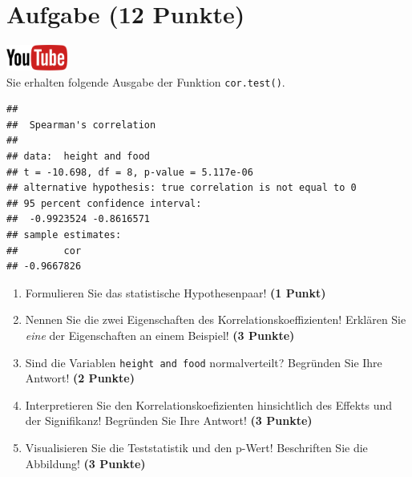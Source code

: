 \documentclass[a4paper, 10pt]{scrartcl}\usepackage[]{graphicx}\usepackage[]{xcolor}
\makeatletter
\newenvironment{kframe}{%
 \def\at@end@of@kframe{}%
 \ifinner\ifhmode%
  \def\at@end@of@kframe{\end{minipage}}%
  \begin{minipage}{\columnwidth}%
 \fi\fi%
 \def\FrameCommand##1{\hskip\@totalleftmargin \hskip-\fboxsep
 \colorbox{shadecolor}{##1}\hskip-\fboxsep
     \hskip-\linewidth \hskip-\@totalleftmargin \hskip\columnwidth}%
 \MakeFramed {\advance\hsize-\width
   \@totalleftmargin\z@ \linewidth\hsize
   \@setminipage}}%
 {\par\unskip\endMakeFramed%
 \at@end@of@kframe}
\newenvironment{knitrout}{}{} %
\makeatother
\begin{document}
 
\clearpage

\section{Aufgabe \hfill (12 Punkte)}

\hfill\href{https://youtu.be/C9skfFRTHhI}{\includegraphics[width =
   2cm]{img/youtube}}\\[1Ex]

Sie erhalten folgende \Rlogo Ausgabe der Funktion \texttt{cor.test()}.

\begin{knitrout}
\color{fgcolor}\begin{kframe}
\begin{verbatim}
## 
## 	Spearman's correlation
## 
## data:  height and food
## t = -10.698, df = 8, p-value = 5.117e-06
## alternative hypothesis: true correlation is not equal to 0
## 95 percent confidence interval:
##  -0.9923524 -0.8616571
## sample estimates:
##        cor 
## -0.9667826
\end{verbatim}
\end{kframe}
\end{knitrout}


\begin{enumerate}
  \item Formulieren Sie das statistische Hypothesenpaar! \textbf{(1
Punkt)}
\item Nennen Sie die zwei Eigenschaften des Korrelationskoeffizienten!
  Erkl{\"a}ren Sie \textit{eine} der Eigenschaften an einem Beispiel! \textbf{(3
    Punkte)}
\item Sind die Variablen \texttt{height and food} normalverteilt?
  Begr{\"u}nden Sie Ihre Antwort! \textbf{(2 Punkte)}
\item Interpretieren Sie den Korrelationskoefizienten hinsichtlich des
  Effekts und der Signifikanz! Begr{\"u}nden Sie
  Ihre Antwort! \textbf{(3 Punkte)}
\item Visualisieren Sie die Teststatistik und den p-Wert! Beschriften Sie die Abbildung! \textbf{(3 Punkte)} 
\end{enumerate} 
\clearpage
\end{document}
